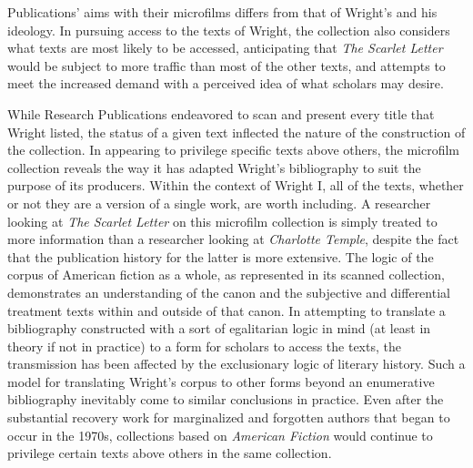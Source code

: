 Publications' aims with their microfilms differs from that of Wright's and his ideology. In pursuing access to the texts of Wright, the collection also considers what texts are most likely to be accessed, anticipating that \textit{The Scarlet Letter} would be subject to more traffic than most of the other texts, and attempts to meet the increased demand with a perceived idea of what scholars may desire. 

While Research Publications endeavored to scan and present every title that Wright listed, the status of a given text inflected the nature of the construction of the collection. In appearing to privilege specific texts above others, the microfilm collection reveals the way it has adapted Wright's bibliography to suit the purpose of its producers. Within the context of Wright I, all of the texts, whether or not they are a version of a single work, are worth including. A researcher looking at \textit{The Scarlet Letter} on this microfilm collection is simply treated to more information than a researcher looking at \textit{Charlotte Temple}, despite the fact that the publication history for the latter is more extensive. The logic of the corpus of American fiction as a whole, as represented in its scanned collection, demonstrates an understanding of the canon and the subjective and differential treatment texts within and outside of that canon. In attempting to translate a bibliography constructed with a sort of egalitarian logic in mind (at least in theory if not in practice) to a form for scholars to access the texts, the transmission has been affected by the exclusionary logic of literary history. Such a model for translating Wright's corpus to other forms beyond an enumerative bibliography inevitably come to similar conclusions in practice. Even after the substantial recovery work for marginalized and forgotten authors that began to occur in the 1970s, collections based on \textit{American Fiction} would continue to privilege certain texts above others in the same collection. 


